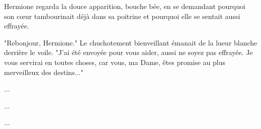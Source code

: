 Hermione regarda la douce apparition, bouche bée, en se demandant pourquoi son cœur tambourinait déjà dans sa poitrine et pourquoi elle se sentait aussi effrayée.

"Rebonjour, Hermione." Le chuchotement bienveillant émanait de la lueur blanche derrière le voile. "J'ai été envoyée pour vous aider, aussi ne soyez pas effrayée. Je vous servirai en toutes choses, car vous, ma Dame, êtes promise au plus merveilleux des destins..."


\begin{center}...\end{center}



\begin{center}...\end{center}



\begin{center}...\end{center}



